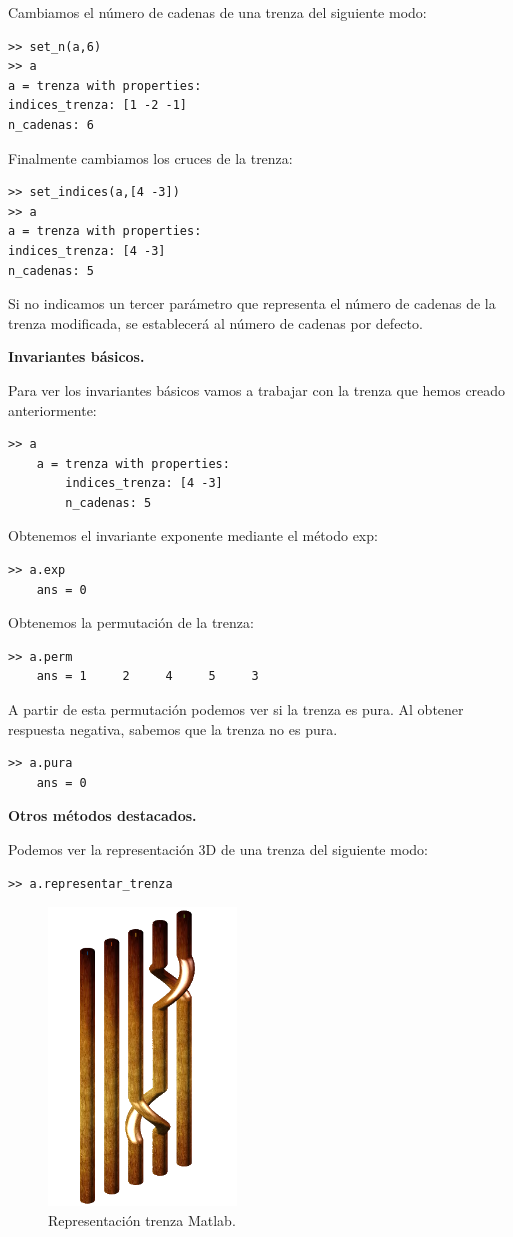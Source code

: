 Cambiamos el número de cadenas de una trenza del siguiente modo:
\begin{lstlisting}
>> set_n(a,6)
>> a
a = trenza with properties:
indices_trenza: [1 -2 -1]
n_cadenas: 6
\end{lstlisting}

Finalmente cambiamos los cruces de la trenza:
\begin{lstlisting}
>> set_indices(a,[4 -3])
>> a
a = trenza with properties:
indices_trenza: [4 -3]
n_cadenas: 5
\end{lstlisting}
Si no indicamos un tercer parámetro que representa el número de cadenas de la trenza modificada, se establecerá al número de cadenas por defecto. 

\newpage
\begin{center}
	\textbf{Invariantes básicos.}
\end{center}
Para ver los invariantes básicos vamos a trabajar con la trenza que hemos creado anteriormente:
\begin{lstlisting}
>> a
	a = trenza with properties:
	    indices_trenza: [4 -3]
	    n_cadenas: 5
\end{lstlisting}

Obtenemos el invariante exponente mediante el método exp:
\begin{lstlisting}
>> a.exp
	ans = 0
\end{lstlisting}

Obtenemos la permutación de la trenza:
\begin{lstlisting}
>> a.perm	
	ans = 1     2     4     5     3
\end{lstlisting}

A partir de esta permutación podemos ver si la trenza es pura. Al obtener respuesta negativa, sabemos que la trenza no es pura. 
\begin{lstlisting}
>> a.pura	
	ans = 0
\end{lstlisting}

\begin{center}
	\textbf{Otros métodos destacados.}
\end{center}
Podemos ver la representación 3D de una trenza del siguiente modo:
\begin{lstlisting}
>> a.representar_trenza
\end{lstlisting}
\begin{figure}[h!]
	\centering
	\includegraphics[width=5cm]{img/infor1.png}
	\caption{Representación trenza Matlab.}
	\label{inf1} 
\end{figure}

